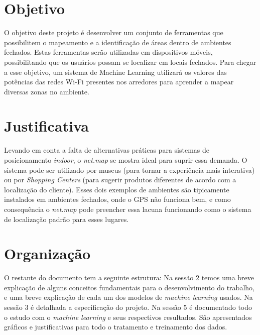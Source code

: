 \section{Objetivo}\label{sec:objetctive}
O objetivo deste projeto é desenvolver um conjunto de ferramentas que possibilitem
o mapeamento e a identificação de áreas dentro de ambientes fechados. Estas
ferramentas serão utilizadas em dispositivos móveis, possibilitando que os
usuários possam se localizar em locais fechados. Para chegar a esse objetivo, um
sistema de Machine Learning utilizará os valores das potências das redes Wi-Fi
presentes nos arredores para aprender a mapear diversas zonas no ambiente.

\section{Justificativa}\label{sec:justify}
Levando em conta a falta de alternativas práticas para sistemas de posicionamento \textit{indoor}, o \textit{net.map} se mostra ideal para suprir essa demanda. O sistema pode ser utilizado por museus (para tornar a experiência mais interativa) ou por \textit{Shopping Centers}  (para sugerir produtos diferentes de acordo com a localização do cliente). Esses dois exemplos de ambientes são tipicamente instalados em ambientes fechados, onde o GPS não funciona bem, e como consequência o \textit{net.map} pode preencher essa lacuna funcionando como o sistema de localização padrão para esses lugares.

\section{Organização}\label{sec:organization}

O restante do documento tem a seguinte estrutura: Na sessão 2 temos uma breve explicação de alguns conceitos fundamentais para o desenvolvimento do trabalho, e uma breve explicação de cada um dos modelos de \textit{machine learning} usados. Na sessão 3 é detalhada a especificação do projeto. Na sessão 5 é documentado todo o estudo com o \textit{machine learning} e seus respectivos resultados. São apresentados gráficos e justificativas para todo o tratamento e treinamento dos dados.